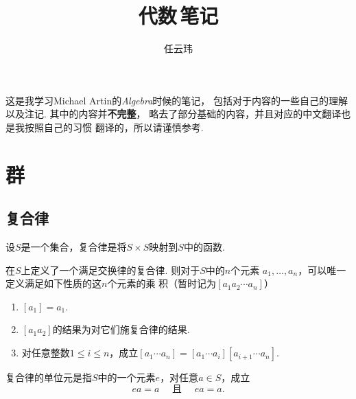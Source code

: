 

\title{代数$\,$笔记}
\author{任云玮}
\date{}



\maketitle
\tableofcontents
\newpage

  这是我学习Michael Artin的\textit{Algebra}时候的笔记，
  包括对于内容的一些自己的理解以及注记. 其中的内容并\textbf{不完整}，
  略去了部分基础的内容，并且对应的中文翻译也是我按照自己的习惯
  翻译的，所以请谨慎参考.



\newpage
\section{群}

\subsection{复合律}

  \begin{defi}
    设$S$是一个集合，复合律是将$S\times S$映射到$S$中的函数.
  \end{defi}

  \begin{pos}[唯一性]
    在$S$上定义了一个满足交换律的复合律. 则对于$S$中的$n$个元素
    $a_1,\dots,a_n$，可以唯一定义满足如下性质的这$n$个元素的乘
    积（暂时记为$[a_1a_2\cdots a_n]$）
    \begin{enumerate}
      \item $[a_1]=a_1$.
      \item $[a_1a_2]$的结果为对它们施复合律的结果.
      \item 对任意整数$1\le i\le n$，成立$[a_1\cdots a_n] =
        [a_1\cdots a_i][a_{i+1}\cdots a_n]$.
    \end{enumerate}
  \end{pos}

  \begin{defi}[单位元]
    复合律的单位元是指$S$中的一个元素$e$，对任意$a\in S$，成立
    \[
      ea=a \quad \text{ 且 } \quad ea = a.
    \]
  \end{defi}

